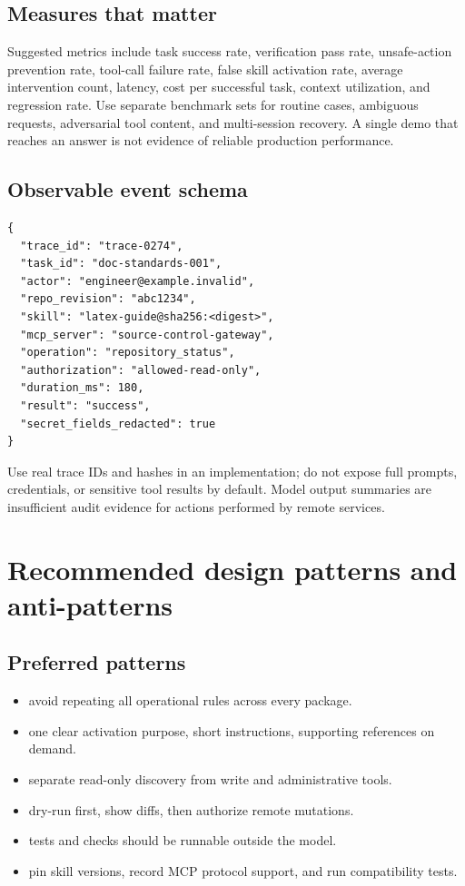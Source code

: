 \documentclass[11pt,letterpaper]{article}
\begin{document}
\subsection{Measures that matter}
Suggested metrics include task success rate, verification pass rate, unsafe-action prevention rate, tool-call failure rate, false skill activation rate, average intervention count, latency, cost per successful task, context utilization, and regression rate. Use separate benchmark sets for routine cases, ambiguous requests, adversarial tool content, and multi-session recovery. A single demo that reaches an answer is not evidence of reliable production performance.

\subsection{Observable event schema}
\par\smallskip{}\par
\begin{verbatim}
{
  "trace_id": "trace-0274",
  "task_id": "doc-standards-001",
  "actor": "engineer@example.invalid",
  "repo_revision": "abc1234",
  "skill": "latex-guide@sha256:<digest>",
  "mcp_server": "source-control-gateway",
  "operation": "repository_status",
  "authorization": "allowed-read-only",
  "duration_ms": 180,
  "result": "success",
  "secret_fields_redacted": true
}
\end{verbatim}
Use real trace IDs and hashes in an implementation; do not expose full prompts, credentials, or sensitive tool results by default. Model output summaries are insufficient audit evidence for actions performed by remote services.

\section{Recommended design patterns and anti-patterns}
\subsection{Preferred patterns}
\begin{itemize}
\item {} avoid repeating all operational rules across every package.
\item {} one clear activation purpose, short instructions, supporting references on demand.
\item {} separate read-only discovery from write and administrative tools.
\item {} dry-run first, show diffs, then authorize remote mutations.
\item {} tests and checks should be runnable outside the model.
\item {} pin skill versions, record MCP protocol support, and run compatibility tests.
\end{itemize}
\end{document}
